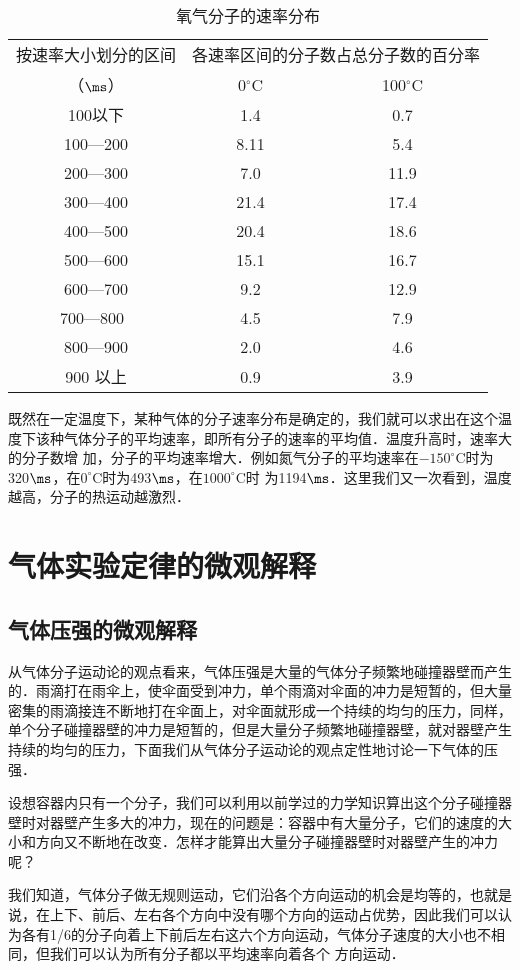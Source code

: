 \begin{table}
	\centering\caption{氧气分子的速率分布}
	\begin{tabular}{ccc}
\hline
按速率大小划分的区间 & \multicolumn{2}{c}{各速率区间的分子数占总分子数的百分率}\\
（$\ms$）& 0$^\circ $C & 100$^\circ $C\\
\hline
100以下 & 1.4 & 0.7\\
100—200 &	8.11 &	5.4
\\
200—300 &	7.0	 &11.9
\\
300—400 &	21.4 &	17.4
\\
400—500 &	20.4 &	18.6
\\
500—600 &	15.1 &	16.7
\\
600—700 &	9.2 &	12.9
\\
700—800  &	4.5 &	7.9
\\
800—900 &	2.0 &	4.6
\\
900 以上 &	0.9 &	3.9\\
\hline
	\end{tabular}
\end{table}

既然在一定温度下，某种气体的分子速率分布是确定的，我们就可以求出在这个温度下该种气体分子的平均速率，即所有分子的速率的平均值．温度升高时，速率大的分子数增
加，分子的平均速率增大．例如氮气分子的平均速率在$-150^\circ $C时为320$\ms$，在$0^\circ $C时为493$\ms$，在$1000^\circ $C时
为1194$\ms$．这里我们又一次看到，温度越高，分子的热运动越激烈．

\section{气体实验定律的微观解释}
\subsection{气体压强的微观解释} 
从气体分子运动论的观点看来，气体压强是大量的气体分子频繁地碰撞器壁而产生的．雨滴打在雨伞上，使伞面受到冲力，单个雨滴对伞面的冲力是短暂的，但大量密集的雨滴接连不断地打在伞面上，对伞面就形成一个持续的均匀的压力，同样，单个分子碰撞器壁的冲力是短暂的，但是大量分子频繁地碰撞器壁，就对器壁产生持续的均匀的压力，下面我们从气体分子运动论的观点定性地讨论一下气体的压强．

设想容器内只有一个分子，我们可以利用以前学过的力学知识算出这个分子碰撞器壁时对器壁产生多大的冲力，现在的问题是：容器中有大量分子，它们的速度的大小和方向又不断地在改变．怎样才能算出大量分子碰撞器壁时对器壁产生的冲力呢？

我们知道，气体分子做无规则运动，它们沿各个方向运动的机会是均等的，也就是说，在上下、前后、左右各个方向中没有哪个方向的运动占优势，因此我们可以认为各有1/6的分子向着上下前后左右这六个方向运动，气体分子速度的大小也不相同，但我们可以认为所有分子都以平均速率向着各个
方向运动．

